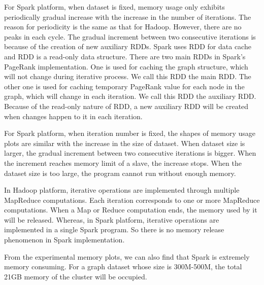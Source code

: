 \documentclass[10pt,conference,compsocconf]{IEEEtran}
\begin{document}
For Spark platform, when dataset is fixed, memory usage only exhibits periodically gradual increase with the increase in the number of iterations. The reason for periodicity is the same as that for Hadoop. However, there are no peaks in each cycle. The gradual increment between two consecutive iterations is because of the creation of new auxiliary RDDs. Spark uses RDD for data cache and RDD is a read-only data structure. There are two main RDDs in Spark's PageRank implementation. One is used for caching the graph structure, which will not change during iterative process. We call this RDD the main RDD. The other one is used for caching temporary PageRank value for each node in the graph, which will change in each iteration. We call this RDD the auxiliary RDD. Because of the read-only nature of RDD, a new auxiliary RDD will be created when changes happen to it in each iteration.

For Spark platform, when iteration number is fixed, the shapes of memory usage plots are similar with the increase in the size of dataset. When dataset size is larger, the gradual increment between two consecutive iterations is bigger. When the increment reaches memory limit of a slave, the increase stops. When the dataset size is too large, the program cannot run without enough memory.

In Hadoop platform, iterative operations are implemented through multiple MapReduce computations. Each iteration corresponds to one or more MapReduce computations. When a Map or Reduce computation ends, the memory used by it will be released. Whereas, in Spark platform, iterative operations are implemented in a single Spark program. So there is no memory release phenomenon in Spark implementation. 

From the experimental memory plots, we can also find that Spark is extremely memory consuming. For a graph dataset whose size is 300M-500M, the total 21GB memory of the cluster will be occupied. 


\end{document}
